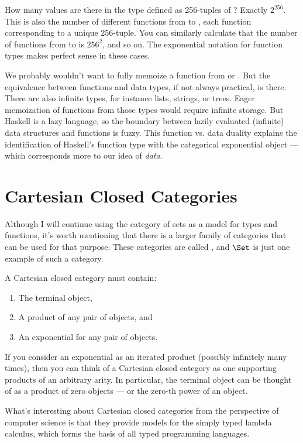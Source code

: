How many values are there in the type defined as 256-tuples of
? Exactly $2^{256}$. This is also the number
of different functions from  to , each
function corresponding to a unique 256-tuple. You can similarly
calculate that the number of functions from  to
 is $256^{2}$, and so on. The exponential
notation for function types makes perfect sense in these cases.

We probably wouldn't want to fully memoize a function from 
or . But the equivalence between functions and data
types, if not always practical, is there. There are also infinite types,
for instance lists, strings, or trees. Eager memoization of functions
from those types would require infinite storage. But Haskell is a lazy
language, so the boundary between lazily evaluated (infinite) data
structures and functions is fuzzy. This function vs. data duality
explains the identification of Haskell's function type with the
categorical exponential object --- which corresponds more to our idea of
\emph{data}.

\section{Cartesian Closed Categories}

Although I will continue using the category of sets as a model for types
and functions, it's worth mentioning that there is a larger family of
categories that can be used for that purpose. These categories are
called , and $\Set$ is just one example of
such a category.

A Cartesian closed category must contain:

\begin{enumerate}
  \tightlist
  \item
        The terminal object,
  \item
        A product of any pair of objects, and
  \item
        An exponential for any pair of objects.
\end{enumerate}
If you consider an exponential as an iterated product (possibly
infinitely many times), then you can think of a Cartesian closed
category as one supporting products of an arbitrary arity. In
particular, the terminal object can be thought of as a product of zero
objects --- or the zero-th power of an object.

What's interesting about Cartesian closed categories from the
perspective of computer science is that they provide models for the
simply typed lambda calculus, which forms the basis of all typed
programming languages.

